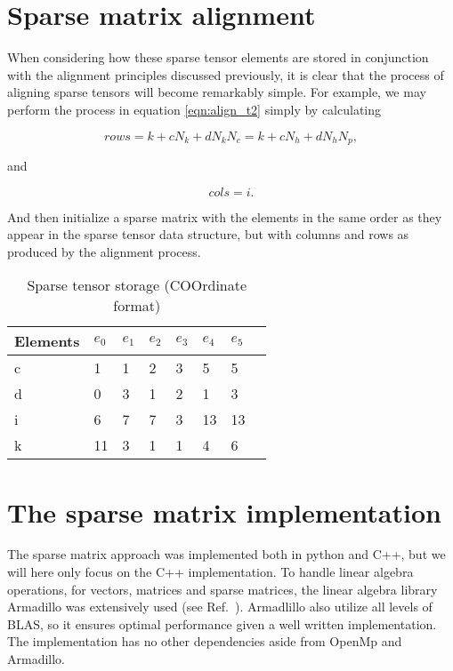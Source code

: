 \section{Sparse matrix alignment}

When considering how these sparse tensor elements are stored in conjunction with the alignment principles discussed previously, it is clear that the process of aligning sparse tensors will become remarkably simple. For example, we may perform the process in equation \ref{eqn:align_t2} simply by calculating

\begin{equation}
rows = k + cN_k + dN_kN_c = k + cN_h + dN_hN_p,
\end{equation}

and

\begin{equation}
cols = i.
\end{equation}

And then initialize a sparse matrix with the elements in the same order as they appear in the sparse tensor data structure, but with columns and rows as produced by the alignment process. 


\begin{table}[hbtp]
\centering
\caption{Sparse tensor storage (COOrdinate format)}
\label{tab:flexmat_class}
\begin{tabular}{llllllll}
Elements & $e_0$ & $e_1$ & $e_2$ & $e_3$ & $e_4$ & $e_5$ \\ \hline
c          & 1 & 1 & 2 & 3 & 5 & 5 \\ \hline 
d    & 0 & 3 & 1 & 2 & 1 & 3 \\ \hline
i   & 6 & 7 & 7 & 3 & 13 & 13 \\ \hline
k    & 11 & 3 & 1& 1 & 4 & 6 \\ \hline
\end{tabular}
\end{table}



\FloatBarrier

\section{The sparse matrix implementation}

The sparse matrix approach was implemented both in python and C++, but we will here only focus on the C++ implementation. To handle linear algebra operations, for vectors, matrices and sparse matrices, the linear algebra library Armadillo was extensively used (see Ref.~\cite{Armadillo}). Armadlillo also utilize all levels of BLAS, so it ensures optimal performance given a well written implementation. The implementation has no other dependencies aside from OpenMp and Armadillo. 

